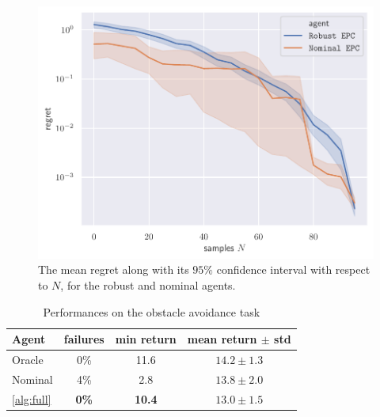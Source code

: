 \documentclass{article}
\begin{document}
\begin{figure}[tp]
	\centering
	\includegraphics[width=0.8\linewidth]{img/regret.pdf}
	\caption{The mean regret along with its $95\%$ confidence interval with respect to $N$, for the robust and nominal agents.}
	\label{fig:regret}
\end{figure}

\begin{table}[tbp]
	\caption{Performances on the obstacle avoidance task}
	\label{tab:obstacle}
	\centering
	\begin{tabular}{lccc}
		\toprule
		Agent &
		failures &
		min return &
		mean return $\pm$ std  \\
		\midrule
		Oracle & 0\% & {11.6} & {$14.2 \pm 1.3$} \\
		\midrule
		{Nominal} & {4\%} & {2.8} & \textbf{$\mathbf{13.8} \pm 2.0$} \\
		\autoref{alg:full} & \textbf{0\%} & \textbf{10.4} & {$13.0 \pm 1.5$} \\
		\bottomrule
	\end{tabular}
\end{table}
\end{document}
